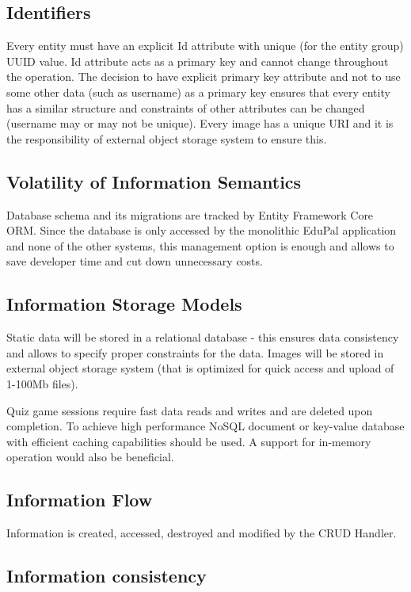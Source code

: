 \subsection{Identifiers}

Every entity must have an explicit Id attribute with unique (for the entity group) UUID value. Id attribute acts as a primary key and cannot change throughout the operation. The decision to have explicit primary key attribute and not to use some other data (such as username) as a primary key ensures that every entity has a similar structure and constraints of other attributes can be changed (username may or may not be unique). Every image has a unique URI and it is the responsibility of external object storage system to ensure this.

\subsection{Volatility of Information Semantics}

Database schema and its migrations are tracked by Entity Framework Core ORM. Since the database is only accessed by the monolithic EduPal application and none of the other systems, this management option is enough and allows to save developer time and cut down unnecessary costs.

\subsection{Information Storage Models}

Static data will be stored in a relational database - this ensures data consistency and allows to specify proper constraints for the data. Images will be stored in external object storage system (that is optimized for quick access and upload of 1-100Mb files).

Quiz game sessions require fast data reads and writes and are deleted upon completion. To achieve high performance NoSQL document or key-value database with efficient caching capabilities should be used. A support for in-memory operation would also be beneficial.

\subsection{Information Flow}

Information is created, accessed, destroyed and modified by the CRUD Handler.

\subsection{Information consistency}

